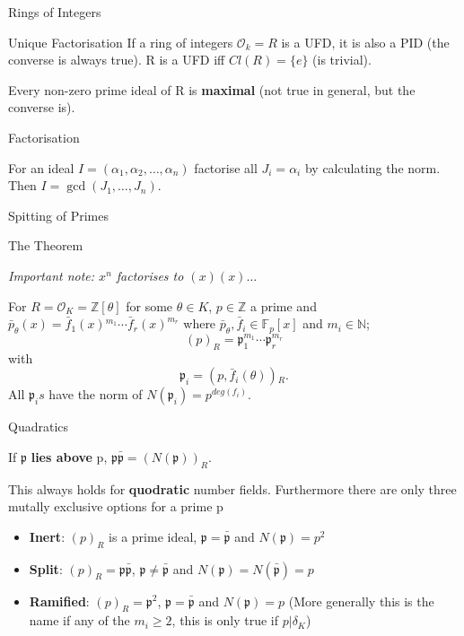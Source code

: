 \documentclass[12pt, letterpaper]{article}
\newcommand{\Z}{\mathbb{Z}}
\newcommand{\F}{\mathbb{F}}
\newcommand{\N}{\mathbb{N}}
\newcommand{\Ok}{\mathcal{O}}
\newcommand{\p}{\mathfrak{p}}
\begin{document}
\begin{section}{Rings of Integers}
\begin{subsection}{Unique Factorisation}
    If a ring of integers \(\Ok_{k} = R\) is a UFD, it is also a PID (the
    converse is always true). R is a UFD iff \(Cl(R) = \{ e \}\) (is trivial).

    Every non-zero prime ideal of R is \textbf{maximal} (not true in general,
    but the converse is).

    \begin{subsubsection}{Factorisation}

      For an ideal \(I = (\alpha_{1}, \alpha_{2}, \dots , \alpha_{n})\)
      factorise all \(J_{i} = \alpha_{i}\) by calculating the norm. Then
      \(I = \gcd(J_{1}, \dots , J_{n})\).

    \end{subsubsection}

  \end{subsection}

  \begin{subsection}{Spitting of Primes}

    \begin{subsubsection}{The Theorem}

      \textit{Important note: \(x^{n}\) factorises to \((x)(x) \dots\)}

      For \(R = \Ok_{K} = \Z[\theta]\) for some \(\theta \in K\), \(p \in \Z\) a
      prime and \(\bar{p}_{\theta}(x) = \bar{f}_{1}(x){}^{m_{1}} \cdots
      \bar{f}_{r}(x)^{m_{r}}\) where \(\bar{p}_{\theta}, \bar{f}_{i} \in
      \F_{p}[x]\) and \(m_{i} \in \N\); \[(p)_{R} = \p^{m_{1}}_{1} \cdots
        \p^{m_{r}}_{r}\] with \[\p_{i} = (p, \bar{f}_{i}(\theta)){}_{R}.\]
      All \(\p_{i}s\) have the norm of \(N(\p_{i}) = p^{deg(f_{i})}\).

    \end{subsubsection}

    \begin{subsubsection}{Quadratics}

      If \(\p\) \textbf{lies above} p, \(\p \bar{\p} = (N(\p))_{R}\).

      This always holds for \textbf{quodratic} number fields. Furthermore there
      are only three mutally exclusive options for a prime p
      \begin{itemize}
        \item \textbf{Inert}: \((p)_{R}\) is a prime ideal,
              \(\p = \bar{\p}\) and \(N(\p) = p^{2}\)
        \item \textbf{Split}: \((p)_{R} = \p \bar{\p}\),
              \(\p \neq \bar{\p}\) and \(N(\p) = N(\bar{\p}) = p\)
        \item \textbf{Ramified}: \((p)_{R} = \p^{2}\),
              \(\p = \bar{\p}\) and \(N(\p) = p\)
              (More generally this is the name if any of the \(m_{i} \geq 2\),
              this is only true if \(p | \delta_{K}\))
      \end{itemize}

    \end{subsubsection}

  \end{subsection}

\end{section}
\end{document}

